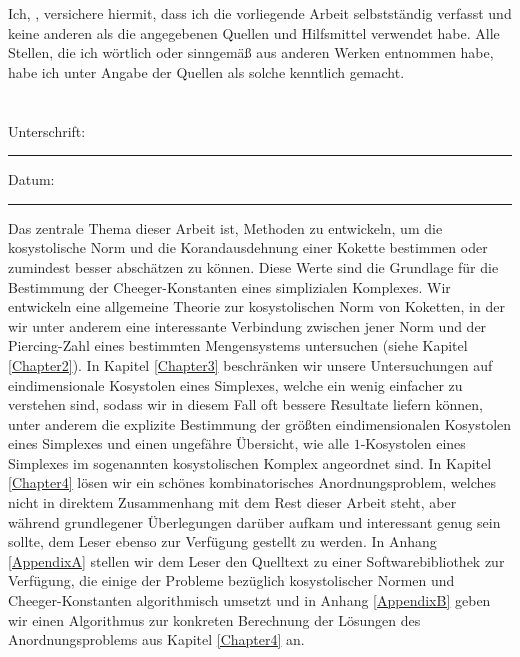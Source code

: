 \documentclass[11pt,english,onehalfspacing,headsepline]{MastersDoctoralThesis}
\begin{document}

\begin{declaration}
\noindent Ich, \authorname, versichere hiermit, dass ich die vorliegende Arbeit selbstständig verfasst und keine anderen als die angegebenen Quellen und Hilfsmittel verwendet habe. Alle Stellen, die ich wörtlich oder sinngemäß aus anderen Werken entnommen habe, habe ich unter Angabe der Quellen als solche kenntlich gemacht.\\ \\ \\
 
\noindent Unterschrift:\\
\rule[0.5em]{25em}{0.5pt} %
 
\noindent Datum:\\
\rule[0.5em]{25em}{0.5pt} %
\end{declaration}

\cleardoublepage


\begin{Zusammenfassung}
Das zentrale Thema dieser Arbeit ist, Methoden zu entwickeln, um die kosystolische Norm und die Korandausdehnung einer Kokette bestimmen oder zumindest besser abschätzen zu können. Diese Werte sind die Grundlage für die Bestimmung der Cheeger-Konstanten eines simplizialen Komplexes. Wir entwickeln eine allgemeine Theorie zur kosystolischen Norm von Koketten, in der wir unter anderem eine interessante Verbindung zwischen jener Norm und der Piercing-Zahl eines bestimmten Mengensystems untersuchen (siehe Kapitel \ref{Chapter2}). In Kapitel \ref{Chapter3} beschränken wir unsere Untersuchungen auf eindimensionale Kosystolen eines Simplexes, welche ein wenig einfacher zu verstehen sind, sodass wir in diesem Fall oft bessere Resultate liefern können, unter anderem die explizite Bestimmung der größten eindimensionalen Kosystolen eines Simplexes und einen ungefähre Übersicht, wie alle \(1\)-Kosystolen eines Simplexes im sogenannten kosystolischen Komplex angeordnet sind. In Kapitel \ref{Chapter4} lösen wir ein schönes kombinatorisches Anordnungsproblem, welches nicht in direktem Zusammenhang mit dem Rest dieser Arbeit steht, aber während grundlegener Überlegungen darüber aufkam und interessant genug sein sollte, dem Leser ebenso zur Verfügung gestellt zu werden. In Anhang \ref{AppendixA} stellen wir dem Leser den Quelltext zu einer Softwarebibliothek zur Verfügung, die einige der Probleme bezüglich kosystolischer Normen und Cheeger-Konstanten algorithmisch umsetzt und in Anhang \ref{AppendixB} geben wir einen Algorithmus zur konkreten Berechnung der Lösungen des Anordnungsproblems aus Kapitel \ref{Chapter4} an.
\end{Zusammenfassung}
\end{document}
